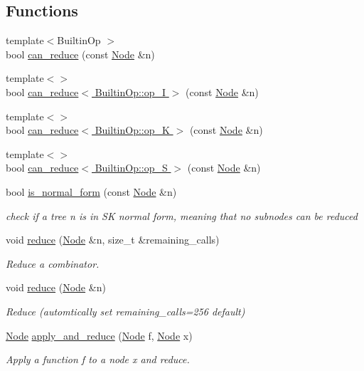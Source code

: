 \subsection*{Functions}
\begin{DoxyCompactItemize}
\item 
{\footnotesize template$<$Builtin\+Op $>$ }\\bool \hyperlink{namespace_combinators_aa3c93f1edab6764d54dda56aafac9cd3}{can\+\_\+reduce} (const \hyperlink{class_node}{Node} \&n)
\item 
{\footnotesize template$<$$>$ }\\bool \hyperlink{namespace_combinators_ad95b1d79317c4d84eb4f96bac4176fc5}{can\+\_\+reduce$<$ Builtin\+Op\+::op\+\_\+\+I $>$} (const \hyperlink{class_node}{Node} \&n)
\item 
{\footnotesize template$<$$>$ }\\bool \hyperlink{namespace_combinators_acf147e40e9f56872bedc87bd63705672}{can\+\_\+reduce$<$ Builtin\+Op\+::op\+\_\+\+K $>$} (const \hyperlink{class_node}{Node} \&n)
\item 
{\footnotesize template$<$$>$ }\\bool \hyperlink{namespace_combinators_a20138fc667812b7b36885b52387f85e0}{can\+\_\+reduce$<$ Builtin\+Op\+::op\+\_\+\+S $>$} (const \hyperlink{class_node}{Node} \&n)
\item 
bool \hyperlink{namespace_combinators_a29877c1bfde5b9807fd7a7538efe9e0c}{is\+\_\+normal\+\_\+form} (const \hyperlink{class_node}{Node} \&n)
\begin{DoxyCompactList}\small\item\em check if a tree n is in SK normal form, meaning that no subnodes can be reduced \end{DoxyCompactList}\item 
void \hyperlink{namespace_combinators_a6abc966e0ab0f2aa8170712f32541458}{reduce} (\hyperlink{class_node}{Node} \&n, size\+\_\+t \&remaining\+\_\+calls)
\begin{DoxyCompactList}\small\item\em Reduce a combinator. \end{DoxyCompactList}\item 
void \hyperlink{namespace_combinators_a10b79cf8cc79cd5505e8d3c70470aab7}{reduce} (\hyperlink{class_node}{Node} \&n)
\begin{DoxyCompactList}\small\item\em Reduce (automtically set remaining\+\_\+calls=256 default) \end{DoxyCompactList}\item 
\hyperlink{class_node}{Node} \hyperlink{namespace_combinators_a30e2a8ed9eb766eb35ce3feb10cbd59a}{apply\+\_\+and\+\_\+reduce} (\hyperlink{class_node}{Node} f, \hyperlink{class_node}{Node} x)
\begin{DoxyCompactList}\small\item\em Apply a function f to a node x and reduce. \end{DoxyCompactList}\end{DoxyCompactItemize}
